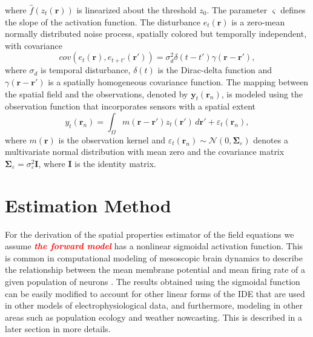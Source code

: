 \documentclass[10pt,twocolumn,twoside]{IEEEtran}
\newcommand{\dean}[1]{\textsf{\emph{\textbf{\textcolor{red}{#1}}}}}
\begin{document}
where $\hat{f}(z_t\left(\mathbf{r}\right))$ is linearized about the threshold $z_0$. The parameter $\varsigma$ defines the slope of the activation function. The disturbance $e_{t}(\mathbf{r})$ is a zero-mean normally distributed noise process, spatially colored but temporally independent, with covariance \cite{Rasmussen2005}
\begin{equation}
cov\left(e_{t}\left(\mathbf{r}\right),e_{t+t'}\left(\mathbf{r'}\right)\right)=\sigma_d^2\delta(t-t')\gamma(\mathbf{r}-\mathbf{r'}),
\label{eq:FieldDisturbance}
\end{equation}
where $\sigma_d$ is temporal disturbance, $\delta(t)$ is the Dirac-delta function and $\gamma(\mathbf{r}-\mathbf{r'})$ is a spatially homogeneous covariance function. The mapping between the spatial field and the observations, denoted by $\mathbf{y}_t(\mathbf{r}_n)$, is modeled using the observation function that incorporates sensors with a spatial extent
\begin{equation}\label{eq:ObservationEquation}
	y_t(\mathbf{r}_n) = \int_{\Omega} { m\left(\mathbf{r}-\mathbf{r}'\right) z_t\left(\mathbf{r}'\right) \, d\mathbf{r}'} + \varepsilon_t(\mathbf{r}_n), 
\end{equation}
where $m\left(\mathbf{r}\right)$ is the observation kernel and $\varepsilon_t(\mathbf{r}_n) \sim \mathcal{N}\left(0,\boldsymbol{\Sigma}_{\varepsilon}\right)$ denotes a multivariate normal distribution with mean zero and the covariance matrix $\boldsymbol{\Sigma}_{\varepsilon} = \sigma_{\varepsilon}^2\mathbf{I}$, where $\mathbf{I}$ is the identity matrix.

\section{Estimation Method}\label{sec:EstimationMethod}
For the derivation of the spatial properties estimator of the field equations we assume \dean{the forward model} has a nonlinear sigmoidal activation function. This is common in computational modeling of mesoscopic brain dynamics to describe the relationship between the mean membrane potential and mean firing rate of a given population of neurons \cite{Freeman1975}. The results obtained using the sigmoidal function can be easily modified to account for other linear forms of the IDE that are used in other models of electrophysiological data, and furthermore, modeling in other areas such as population ecology and weather nowcasting. This is described in a later section in more details. 
\end{document}
